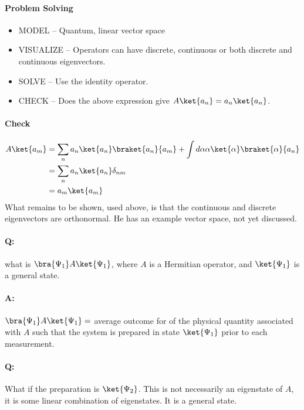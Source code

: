 \paragraph{Problem Solving}

\begin{itemize}
\item MODEL -- Quantum, linear vector space
\item VISUALIZE -- Operators can have discrete, continuous or both discrete and continuous eigenvectors.
\item SOLVE -- Use the identity operator.
\item CHECK -- Does the above expression give \(A \ket{a_n} = a_n \ket{a_n}\).
\end{itemize}

\paragraph{Check}
%
\begin{equation}\label{eqn:lecture8makingSenseOfQM:1080}
\begin{aligned}
A \ket{a_m}
&= \sum_n a_n \ket{a_n} \braket{a_n}{a_m} + \int d\alpha \alpha \ket{\alpha} \braket{\alpha}{a_n} \\
&= \sum_n a_n \ket{a_n} \delta_{nm} \\
&= a_m \ket{a_m}
\end{aligned}
\end{equation}
%
What remains to be shown, used above, is that the continuous and discrete eigenvectors are orthonormal.  He has an example vector space, not yet discussed.

\paragraph{Q:} what is \(\bra{\Psi_1} A \ket{\Psi_1}\), where \(A\) is a Hermitian operator, and \(\ket{\Psi_1}\) is a general state.

\paragraph{A:} \(\bra{\Psi_1} A \ket{\Psi_1} =\) average outcome for  of the physical quantity associated with \(A\) such that the system is prepared in state \(\ket{\Psi_1}\) prior to each measurement.

\paragraph{Q:}  What if the preparation is \(\ket{\Psi_2}\).  This is not necessarily an eigenstate of \(A\), it is some linear combination of eigenstates.  It is a general state.
